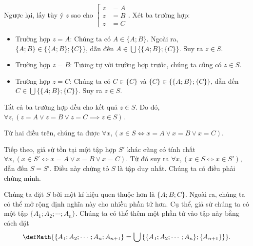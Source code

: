 Ngược lại, lấy tùy ý $z$ sao cho $\left[\begin{aligned}
      z &= A \\
      z &= B \\
      z &= C
   \end{aligned}\right.$. Xét ba trường hợp:
\begin{itemize}
   \item \textcolor{colorEmphasis}{Trường hợp $z = A$}: Chúng ta có $A \in \{A; B\}$. Ngoài ra, $\{A; B\} \in \big\{\{A; B\}; \{C\}\big\}$, dẫn đến $A \in \bigcup \big\{\{A; B\}; \{C\}\big\}$. Suy ra $z \in S$.
   \item \textcolor{colorEmphasisCyan}{Trường hợp $z = B$}: Tương tự với trường hợp trước, chúng ta cũng có $z \in S$.
   \item \textcolor{colorEmphasisGreen}{Trường hợp $z = C$}: Chúng ta có $C \in \{C\}$ và $\{C\} \in \big\{\{A; B\}; \{C\}\big\}$, dẫn đến $C \in \bigcup \big\{\{A; B\}; \{C\}\big\}$. Suy ra $z \in S$.
\end{itemize}
Tất cả ba trường hợp đều cho kết quả $z \in S$. Do đó, $\forall z, (z = A \lor z = B \lor z = C \implies z \in S)$.

Từ hai điều trên, chúng ta được $\forall x, (x \in S \iff x = A \lor x = B \lor x = C)$.

Tiếp theo, giả sử tồn tại một tập hợp $S'$ khác cũng có tính chất $\forall x, (x \in S' \iff x = A \lor x = B \lor x = C)$. Từ đó suy ra $\forall x, (x \in S \iff x \in S')$, dẫn đến $S = S'$. Điều này chứng tỏ $S$ là tập duy nhất. Chúng ta có điều phải chứng minh.

Chúng ta đặt $S$ bởi một kí hiệu quen thuộc hơn là $\{A; B; C\}$. Ngoài ra, chúng ta có thể mở rộng định nghĩa này cho nhiều phần tử hơn. Cụ thể, giả sử chúng ta có một tập $\{A_1; A_2; \cdots; A_n\}$. Chúng ta có thể thêm một phần tử vào tập này bằng cách đặt $$\defMath{\{A_1; A_2; \cdots; A_n; A_{n+1}\} = \bigcup \left\{\{A_1; A_2; \cdots; A_n\}; \{A_{n+1}\}\right\}}.$$

